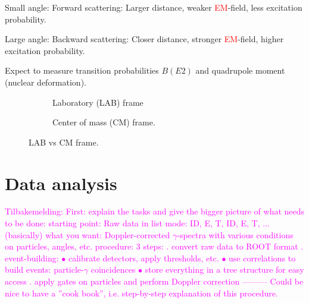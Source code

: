 \documentclass[twoside,english]{uiofysmaster/uiofysmaster}
\begin{document}
Small angle: Forward scattering: Larger distance, weaker \textcolor{red}{EM}-field, less excitation probability.

Large angle: Backward scattering: Closer distance, stronger \textcolor{red}{EM}-field, higher excitation probability. \newline


\bigskip

Expect to measure transition probabilities $B(E2)$ and quadrupole moment (nuclear deformation). 

\bigskip


\begin{figure}
	\centering
	\begin{subfigure}{\textwidth}
		
		\caption{Laboratory (LAB) frame}
		\label{fig:LAB}
	\end{subfigure}
	\begin{subfigure}{\textwidth}
		
		\caption{Center of mass (CM) frame.}
		\label{fig:CM}
	\end{subfigure}
	\caption{LAB vs CM frame.}
	\label{fig:LAB-CM}
\end{figure}





\chapter{Data analysis}  

\textcolor{Magenta}{Tilbakemelding: \newline
First: explain the tasks and give the bigger picture of what needs to be done: \newline 
starting point: Raw data in list mode: ID, E, T, ID, E, T, ... (basically) \newline
what you want: Doppler-corrected $\gamma$-spectra with various conditions on particles, angles, etc. \newline
procedure: 3 steps: . convert raw data to ROOT format . event-building: \newline
$\bullet$ calibrate detectors, apply thresholds, etc. \newline
$\bullet$ use correlations to build events: particle-$\gamma$ coincidences \newline
$\bullet$ store everything in a tree structure for easy access . apply gates on particles and perform Doppler correction \newline
--------- \newline
Could be nice to have a ''cook book'', i.e. step-by-step explanation of this procedure.
}
\end{document}
